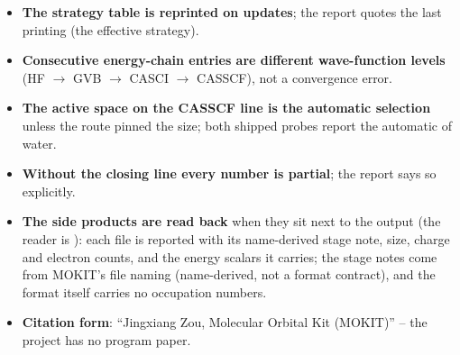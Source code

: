 \begin{readbox}
\begin{itemize}
  \item \textbf{The strategy table is reprinted on updates}; the report
    quotes the last printing (the effective strategy).
  \item \textbf{Consecutive energy-chain entries are different
    wave-function levels} (HF $\to$ GVB $\to$ CASCI $\to$ CASSCF), not a
    convergence error.
  \item \textbf{The active space on the CASSCF line is the automatic
    selection} unless the route pinned the size; both shipped probes
    report the automatic  of water.
  \item \textbf{Without the closing 
    line every number is partial}; the report says so explicitly.
  \item \textbf{The  side products are read back} when they sit
    next to the output (the reader is ): each
    file is reported with its name-derived stage note, size, charge and
    electron counts, and the energy scalars it carries; the stage notes
    come from MOKIT's file naming (name-derived, not a format contract),
    and the format itself carries no occupation numbers.
  \item \textbf{Citation form}: ``Jingxiang Zou, Molecular Orbital Kit
    (MOKIT)'' -- the project has no program paper.
\end{itemize}
\end{readbox}
